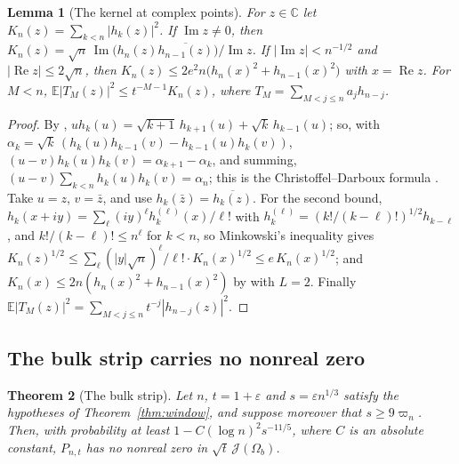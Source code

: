 \documentclass[11pt]{amsart}
\newtheorem{theorem}{Theorem}[section]
\newtheorem{lemma}[theorem]{Lemma}
\theoremstyle{definition}
\theoremstyle{remark}
\numberwithin{equation}{section}
\newcommand{\C}{\mathbb{C}}
\newcommand{\E}{\mathbb{E}}
\newcommand{\eps}{\varepsilon}
\DeclareMathOperator{\re}{Re}
\DeclareMathOperator{\im}{Im}
\begin{document}
\begin{lemma}[The kernel at complex points]\label{lem:near1-kernel}
For $z\in\C$ let $K_n(z)=\sum_{k<n}|h_k(z)|^2$. If $\im z\ne0$, then $K_n(z)=\sqrt n\,\im\bigl(h_n(z)\overline{h_{n-1}(z)}\bigr)/\im z$. If $|\im z|<n^{-1/2}$ and $|\re z|\le2\sqrt n$, then $K_n(z)\le2e^2n\bigl(h_n(x)^2+h_{n-1}(x)^2\bigr)$ with $x=\re z$. For $M<n$, $\E|T_M(z)|^2\le t^{-M-1}K_n(z)$, where $T_M=\sum_{M<j\le n}a_jh_{n-j}$.
\end{lemma}

\begin{proof}
By \cite[\eqref{M-eq:recurrence}]{Main}, $uh_k(u)=\sqrt{k+1}\,h_{k+1}(u)+\sqrt k\,h_{k-1}(u)$; so, with $\alpha_k=\sqrt k\,(h_k(u)h_{k-1}(v)-h_{k-1}(u)h_k(v))$, $(u-v)h_k(u)h_k(v)=\alpha_{k+1}-\alpha_k$, and summing, $(u-v)\sum_{k<n}h_k(u)h_k(v)=\alpha_n$; this is the Christoffel--Darboux formula \cite[Theorem~3.2.2]{Sz}.
 Take $u=z$, $v=\bar z$, and use $h_k(\bar z)=\overline{h_k(z)}$. For the second bound, $h_k(x+iy)=\sum_\ell(iy)^\ell h_k^{(\ell)}(x)/\ell!$ with $h_k^{(\ell)}=(k!/(k-\ell)!)^{1/2}h_{k-\ell}$, and $k!/(k-\ell)!\le n^\ell$ for $k<n$, so Minkowski's inequality gives $K_n(z)^{1/2}\le\sum_\ell(|y|\sqrt n)^\ell/\ell!\cdot K_n(x)^{1/2}\le e\,K_n(x)^{1/2}$; and $K_n(x)\le2n(h_n(x)^2+h_{n-1}(x)^2)$ by \cite[Lemma~\ref{M-lem:cd}]{Main} with $L=2$. Finally $\E|T_M(z)|^2=\sum_{M<j\le n}t^{-j}|h_{n-j}(z)|^2$.
\end{proof}

\subsection{The bulk strip carries no nonreal zero}

\begin{theorem}[The bulk strip]\label{thm:near1-bulk}
Let $n$, $t=1+\eps$ and $s=\eps n^{1/3}$ satisfy the hypotheses of Theorem~\ref{thm:window}, and suppose moreover that $s\ge9\varpi_n$. Then, with probability at least $1-C(\log n)^2s^{-11/5}$, where $C$ is an absolute constant, $P_{n,t}$ has no nonreal zero in $\sqrt t\,\mathcal J(\Omega_b)$.
\end{theorem}
\end{document}
